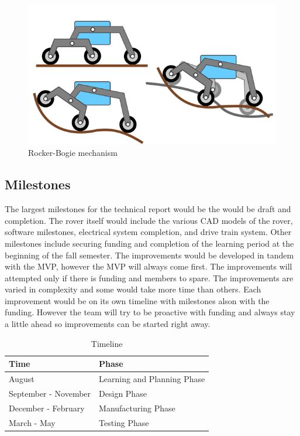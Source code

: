 \documentclass[conference]{IEEEtran} %
\begin{document}
\begin{figure}[hb!]
  \includegraphics[width=\linewidth]{figs/rocker-bogie.png}
  \caption{Rocker-Bogie mechanism}
\label{fig:rockerbogie}
\end{figure}

\subsection{Milestones}
\label{subsec:milestones}
The largest milestones for the technical report would be the would be draft and completion. 
The rover itself would include the various CAD models of the rover, software milestones, electrical system completion, and drive train system. 
Other milestones include securing funding and completion of the learning period at the beginning of the fall semester.
The improvements would be developed in tandem with the MVP, however the MVP will always come first. 
The improvements will attempted only if there is funding and members to spare. 
The improvements are varied in complexity and some would take more time than others. 
Each improvement would be on its own timeline with milestones alson with the funding.
However the team will try to be proactive with funding and always stay a little ahead so improvements can be started right away.

\begin{table}[ht!]
    \caption{Timeline}
    \centering
    {\renewcommand{\arraystretch}{1.5}
    \begin{tabularx}{\linewidth}{LL} 
    \hline
    \textbf{Time} & \textbf{Phase} \\
    \hline
    August & Learning and Planning Phase \\
    September - November & Design Phase  \\
    December - February & Manufacturing Phase \\
    March - May & Testing Phase \\
    \hline
    \end{tabularx}
    }
\label{tab:timeline}
\end{table}
\end{document}
